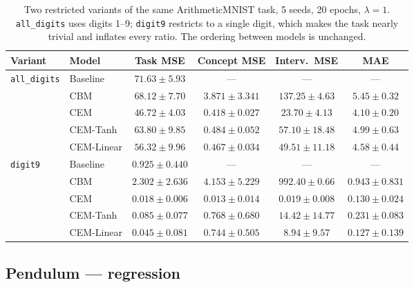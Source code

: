 \documentclass[11pt]{article}
\begin{document}
\begin{table}[h]
\centering
\caption{Two restricted variants of the same ArithmeticMNIST task, 5 seeds,
20 epochs, $\lambda = 1$. \texttt{all\_digits} uses digits 1--9;
\texttt{digit9} restricts to a single digit, which makes the task nearly
trivial and inflates every ratio. The ordering between models is unchanged.}
\label{tab:app-mnist-variants}
\begin{tabular}{llcccc}
\toprule
\textbf{Variant} & \textbf{Model} & \textbf{Task MSE} & \textbf{Concept MSE} &
\textbf{Interv.\ MSE} & \textbf{MAE} \\
\midrule
\multirow{5}{*}{\texttt{all\_digits}}
 & Baseline   & $71.63 \pm 5.93$ & --- & --- & --- \\
 & CBM        & $68.12 \pm 7.70$ & $3.871 \pm 3.341$ & $137.25 \pm 4.63$ & $5.45 \pm 0.32$ \\
 & CEM        & $\mathbf{46.72 \pm 4.03}$ & $\mathbf{0.418 \pm 0.027}$ & $\mathbf{23.70 \pm 4.13}$ & $\mathbf{4.10 \pm 0.20}$ \\
 & CEM-Tanh   & $63.80 \pm 9.85$ & $0.484 \pm 0.052$ & $57.10 \pm 18.48$ & $4.99 \pm 0.63$ \\
 & CEM-Linear & $56.32 \pm 9.96$ & $0.467 \pm 0.034$ & $49.51 \pm 11.18$ & $4.58 \pm 0.44$ \\
\midrule
\multirow{5}{*}{\texttt{digit9}}
 & Baseline   & $0.925 \pm 0.440$ & --- & --- & --- \\
 & CBM        & $2.302 \pm 2.636$ & $4.153 \pm 5.229$ & $992.40 \pm 0.66$ & $0.943 \pm 0.831$ \\
 & CEM        & $\mathbf{0.018 \pm 0.006}$ & $\mathbf{0.013 \pm 0.014}$ & $\mathbf{0.019 \pm 0.008}$ & $0.130 \pm 0.024$ \\
 & CEM-Tanh   & $0.085 \pm 0.077$ & $0.768 \pm 0.680$ & $14.42 \pm 14.77$ & $0.231 \pm 0.083$ \\
 & CEM-Linear & $0.045 \pm 0.081$ & $0.744 \pm 0.505$ & $8.94 \pm 9.57$ & $\mathbf{0.127 \pm 0.139}$ \\
\bottomrule
\end{tabular}
\end{table}

\subsection{Pendulum --- regression}
\end{document}
